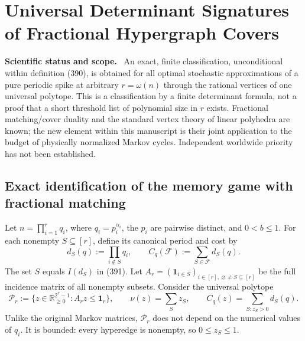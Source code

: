 \documentclass[11pt,a4paper,oneside]{book}
\newcommand{\R}{\mathbb R}\newcommand{\C}{\mathbb C}\newcommand{\Z}{\mathbb Z}\newcommand{\N}{\mathbb N}\newcommand{\Q}{\mathbb Q}
\newcommand{\one}{\mathbf 1}\newcommand{\ii}{\mathrm i}\newcommand{\dd}{\mathrm d}
\newcommand{\note}[1]{\par\medskip\noindent\textbf{#1}\ }
\begin{document}
\chapter{Universal Determinant Signatures of Fractional Hypergraph Covers}
\note{Scientific status and scope.} An exact, finite classification, unconditional within definition (390), is obtained for all optimal stochastic approximations of a pure periodic spike at arbitrary $r=\omega(n)$ through the rational vertices of one universal polytope. This is a classification by a finite determinant formula, not a proof that a short threshold list of polynomial size in $r$ exists. Fractional matching/cover duality and the standard vertex theory of linear polyhedra are known; the new element within this manuscript is their joint application to the budget of physically normalized Markov cycles. Independent worldwide priority has not been established.

\section{Exact identification of the memory game with fractional matching}
Let $n=\prod_{i=1}^rq_i$, where $q_i=p_i^{\alpha_i}$, the $p_i$ are pairwise distinct, and $0<b\le1$. For each nonempty $S\subseteq[r]$, define its canonical period and cost by
\begin{equation}
d_S(q):=\prod_{i\notin S}q_i,\qquad C_q(\mathcal F):=\sum_{S\in\mathcal F}d_S(q).\tag{400}
\end{equation}
The set $S$ equals $I(d_S)$ in (391). Let $A_r=(\one_{i\in S})_{i\in[r],\ \varnothing\ne S\subseteq[r]}$ be the full incidence matrix of all nonempty subsets. Consider the universal polytope
\begin{equation}
\mathcal P_r:=\{z\in\R_{\ge0}^{2^r-1}:A_rz\le\one_r\},\qquad
\nu(z)=\sum_Sz_S,\qquad C_q(z)=\sum_{S:z_S>0}d_S(q).\tag{401}
\end{equation}
Unlike the original Markov matrices, $\mathcal P_r$ does not depend on the numerical values of $q_i$. It is bounded: every hyperedge is nonempty, so $0\le z_S\le1$.
\end{document}
